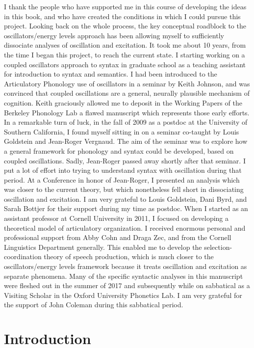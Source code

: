 I thank the people who have supported me in this course of developing the ideas in this book, and who have created the conditions in which I could pursue this project. Looking back on the whole process, the key conceptual roadblock to the oscillators/energy levels approach has been allowing myself to sufficiently dissociate analyses of oscillation and excitation. It took me about 10 years, from the time I began this project, to reach the current state. I starting working on a coupled oscillators approach to syntax in graduate school as a teaching assistant for introduction to syntax and semantics. I had been introduced to the Articulatory Phonology use of oscillators in a seminar by Keith Johnson, and was convinced that coupled oscillations are a general, neurally plausible mechanism of cognition. Keith graciously allowed me to deposit in the Working Papers of the Berkeley Phonology Lab a flawed manuscript which represents those early efforts. In a remarkable turn of luck, in the fall of 2009 as a postdoc at the University of Southern California, I found myself sitting in on a seminar co-taught by Louis Goldstein and Jean-Roger Vergnaud. The aim of the seminar was to explore how a general framework for phonology and syntax could be developed, based on coupled oscillations. Sadly, Jean-Roger passed away shortly after that seminar. I put a lot of effort into trying to understand syntax with oscillation during that period. At a Conference in honor of Jean-Roger, I presented an analysis which was closer to the current theory, but which nonetheless fell short in dissociating oscillation and excitation. I am very grateful to Louis Goldstein, Dani Byrd, and Sarah Bottjer for their support during my time as postdoc. When I started as an assistant professor at Cornell University in 2011, I focused on developing a theoretical model of articulatory organization. I received enormous personal and professional support from Abby Cohn and Draga Zec, and from the Cornell Linguistics Department generally. This enabled me to develop the selection-coordination theory of speech production, which is much closer to the oscillators/energy levels framework because it treats oscillation and excitation as separate phenomena. Many of the specific syntactic analyses in this manuscript were fleshed out in the summer of 2017 and subsequently while on sabbatical as a Visiting Scholar in the Oxford University Phonetics Lab. I am very grateful for the support of John Coleman during this sabbatical period.

\chapter{Introduction}

